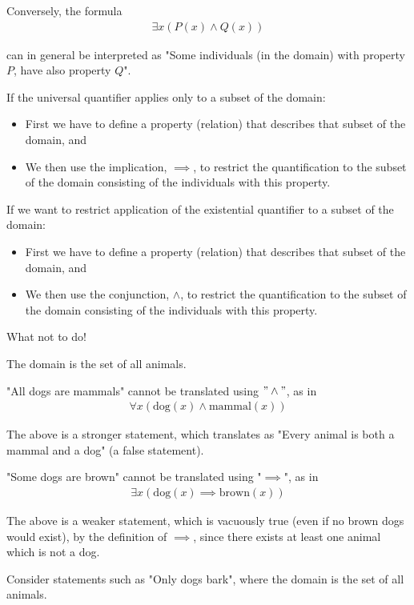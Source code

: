 \documentclass{article}
\begin{document}
Conversely, the formula
\begin{align*}
\exists x(P(x) \wedge Q(x))
\end{align*}

can in general be interpreted as "Some individuals (in the domain) with property $P$, have also property $Q$".

If the universal quantifier applies only to a subset of the domain:
\begin{itemize}
    \item First we have to define a property (relation) that describes that subset of the domain, and
    \item We then use the implication, $\implies$, to restrict the quantification to the subset of the domain consisting of the individuals with this property.
\end{itemize}

If we want to restrict application of the existential quantifier to a subset of the domain:
\begin{itemize}
    \item First we have to define a property (relation) that describes that subset of the domain, and
    \item We then use the conjunction, $\wedge$, to restrict the quantification to the subset of the domain consisting of the individuals with this property.
\end{itemize}

What not to do!

The domain is the set of all animals.

"All dogs are mammals" cannot be translated using $"\wedge"$, as in 
\begin{align*}
\forall x (\text{dog}(x) \wedge \text{mammal}(x))
\end{align*}

The above is a stronger statement, which translates as "Every animal is both a mammal and a dog" (a false statement).

"Some dogs are brown" cannot be translated using "$\implies$", as in 
\begin{align*}
    \exists x (\text{dog}(x) \implies \text{brown}(x))
\end{align*}

The above is a weaker statement, which is vacuously true (even if no brown dogs would exist), by the definition of $\implies$, since there exists at least one animal which is not a dog.

Consider statements such as "Only dogs bark", where the domain is the set of all animals.
\end{document}
